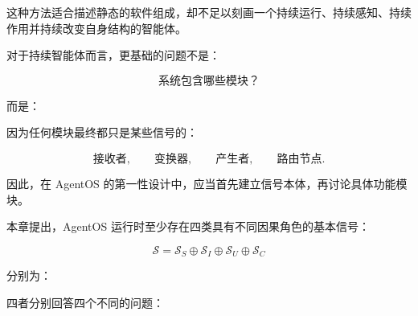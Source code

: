 这种方法适合描述静态的软件组成，却不足以刻画一个持续运行、持续感知、持续作用并持续改变自身结构的智能体。

对于持续智能体而言，更基础的问题不是：

\[
\text{系统包含哪些模块？}
\]

而是：

\begin{statementbox}
\centering
{}
\end{statementbox}

因为任何模块最终都只是某些信号的：

\[
\text{接收者},
\qquad
\text{变换器},
\qquad
\text{产生者},
\qquad
\text{路由节点}.
\]

因此，在 AgentOS 的第一性设计中，应当首先建立信号本体，再讨论具体功能模块。

本章提出，AgentOS 运行时至少存在四类具有不同因果角色的基本信号：

\[
\boxed{
\mathcal S
=
\mathcal S_S
\oplus
\mathcal S_I
\oplus
\mathcal S_U
\oplus
\mathcal S_C
}
\]

分别为：

\begin{statementbox}
\centering
{}
\end{statementbox}

\begin{statementbox}
\centering
{}
\end{statementbox}

\begin{statementbox}
\centering
{}
\end{statementbox}

\begin{statementbox}
\centering
{}
\end{statementbox}

四者分别回答四个不同的问题：

\begin{statementbox}
\centering
{}
\end{statementbox}

